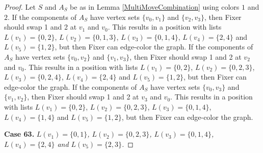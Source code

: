 \documentclass[12pt]{amsart}
\theoremstyle{plain}
\theoremstyle{definition}
\theoremstyle{remark}
\begin{document}
\begin{proof}
Let $S$ and $A_S$ be as in Lemma \ref{MultiMoveCombination} using colors $1$ and $2$. If the components of $A_S$ have vertex sets $\{v_0, v_1\}$ and $\{v_2, v_3\}$, then Fixer should swap 1 and 2 at $v_1$ and $v_0$. This results in a position with lists $L(v_1) = \{0, 2\}$, $L(v_2) = \{0, 1, 3\}$, $L(v_3) = \{0, 1, 4\}$, $L(v_4) = \{2, 4\}$ and $L(v_5) = \{1, 2\}$, but then Fixer can edge-color the graph.
If the components of $A_S$ have vertex sets $\{v_0, v_2\}$ and $\{v_1, v_3\}$, then Fixer should swap 1 and 2 at $v_2$ and $v_0$. This results in a position with lists $L(v_1) = \{0, 2\}$, $L(v_2) = \{0, 2, 3\}$, $L(v_3) = \{0, 2, 4\}$, $L(v_4) = \{2, 4\}$ and $L(v_5) = \{1, 2\}$, but then Fixer can edge-color the graph.
If the components of $A_S$ have vertex sets $\{v_0, v_3\}$ and $\{v_1, v_2\}$, then Fixer should swap 1 and 2 at $v_3$ and $v_0$. This results in a position with lists $L(v_1) = \{0, 2\}$, $L(v_2) = \{0, 2, 3\}$, $L(v_3) = \{0, 1, 4\}$, $L(v_4) = \{1, 4\}$ and $L(v_5) = \{1, 2\}$, but then Fixer can edge-color the graph.

\noindent\textbf{Case 63.  }\textit{$L(v_1) = \{0, 1\}$, $L(v_2) = \{0, 2, 3\}$, $L(v_3) = \{0, 1, 4\}$, $L(v_4) = \{2, 4\}$ and $L(v_5) = \{2, 3\}$.}


\end{proof}
\end{document}
